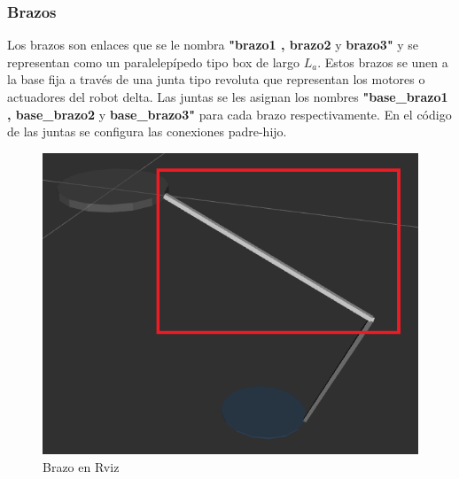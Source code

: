       \newpage

       \subsubsection{Brazos}
        Los brazos son enlaces que se le nombra \textbf{"brazo1 , brazo2} y \textbf{brazo3"} y se representan como un paralelepípedo tipo box de largo \textbf{$L_a$}. Estos brazos se unen a la base fija a través de una junta tipo revoluta que representan los motores o actuadores del robot delta. Las juntas se les asignan los nombres \textbf{"base\_brazo1 , base\_brazo2} y \textbf{base\_brazo3"} para cada brazo respectivamente. En el código de las juntas se configura las conexiones padre-hijo.
        
        
             \begin{figure}[h]
                \centering
                \includegraphics[width=0.4\linewidth]{Main/Chapter6/Images6/cap6_brazo.png}
                \caption{Brazo en Rviz}
                \label{f:Cap6_urdf_2}
            \end{figure}  
            

